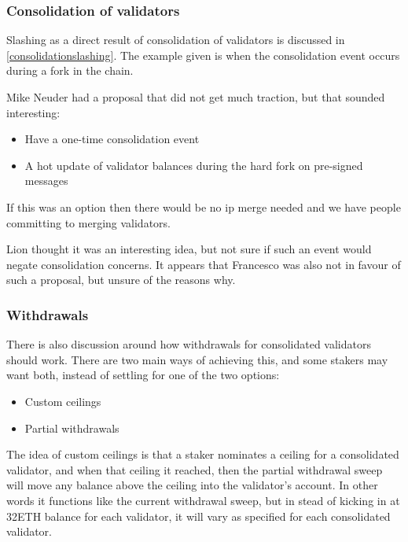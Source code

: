 \subsubsection{Consolidation of validators}
Slashing as a direct result of consolidation of validators is discussed in \ref{consolidationslashing}. The example given is when the consolidation event occurs during a fork in the chain.

Mike Neuder had a proposal that did not get much traction, but that sounded interesting:\\
\begin{itemize}
\item Have a one-time consolidation event
\item A hot update of validator balances during the hard fork on pre-signed messages 
\end{itemize}
If this was an option then there would be no ip merge needed and we have people committing to merging validators.

Lion thought it was an interesting idea, but not sure if such an event would negate consolidation concerns. It appears that Francesco was also not in favour of such a proposal, but unsure of the reasons why.

\subsubsection{Withdrawals}
There is also discussion around how withdrawals for consolidated validators should work. There are two main ways of achieving this, and some stakers may want both, instead of settling for one of the two options:
\begin{itemize}
\item Custom ceilings
\item Partial withdrawals
\end{itemize}

The idea of custom ceilings is that a staker nominates a ceiling for a consolidated validator, and when that ceiling it reached, then the partial withdrawal sweep will move any balance above the ceiling into the validator's account. In other words it functions like the current withdrawal sweep, but in stead of kicking in at 32ETH balance for each validator, it will vary as specified for each consolidated validator.

